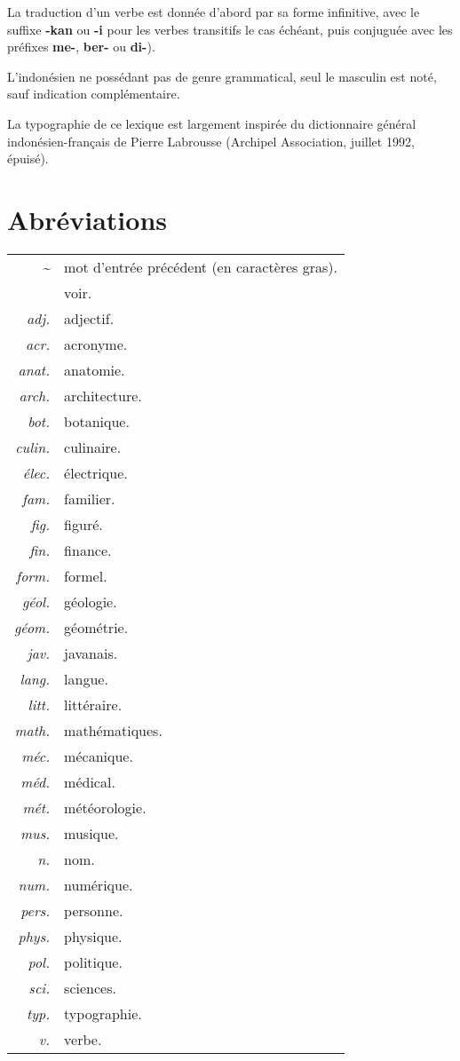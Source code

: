 \documentclass[10pt,twocolumns]{article}
\newcommand{\dt}{\textit{\textasciitilde}} %
\newcommand{\dv}[1]{\rightarrow~\textit{#1}} %
\begin{document}
La traduction d'un verbe est donnée d'abord par sa forme infinitive, avec le suffixe \textbf{-kan} ou \textbf{-i} pour les verbes transitifs le cas échéant, puis conjuguée avec les préfixes \textbf{me-}, \textbf{ber-} ou \textbf{di-}).

L'indonésien ne possédant pas de genre grammatical, seul le masculin est noté, sauf indication complémentaire.

La typographie de ce lexique est largement inspirée du dictionnaire général indonésien-français de Pierre Labrousse (Archipel Association, juillet 1992, épuisé).


\newpage

\section*{Abréviations}
\begin{tabular}{rl}
\dt				&	mot d'entrée précédent (en caractères gras).\\
\dv{} 			&	voir.\\
\textit{adj.}	&	adjectif.\\
\textit{acr.}	&	acronyme.\\
\textit{anat.}	&	anatomie.\\
\textit{arch.}	&	architecture.\\
\textit{bot.}	&	botanique.\\
\textit{culin.}	&	culinaire.\\
\textit{élec.}	&	électrique.\\
\textit{fam.}	&	familier.\\
\textit{fig.}	&	figuré.\\
\textit{fin.}	&	finance.\\
\textit{form.}	&	formel.\\
\textit{géol.}	&	géologie.\\
\textit{géom.}	&	géométrie.\\
\textit{jav.}	&	javanais.\\
\textit{lang.}	&	langue.\\
\textit{litt.}	&	littéraire.\\
\textit{math.}	&	mathématiques.\\
\textit{méc.}	&	mécanique.\\
\textit{méd.}	&	médical.\\
\textit{mét.}	&	météorologie.\\
\textit{mus.}	&	musique.\\
\textit{n.}		&	nom.\\
\textit{num.}	&	numérique.\\
\textit{pers.}	&	personne.\\
\textit{phys.}	&	physique.\\
\textit{pol.}	&	politique.\\
\textit{sci.}	&	sciences.\\
\textit{typ.}	&	typographie.\\
\textit{v.}		&	verbe.\\
\end{tabular}
\end{document}
